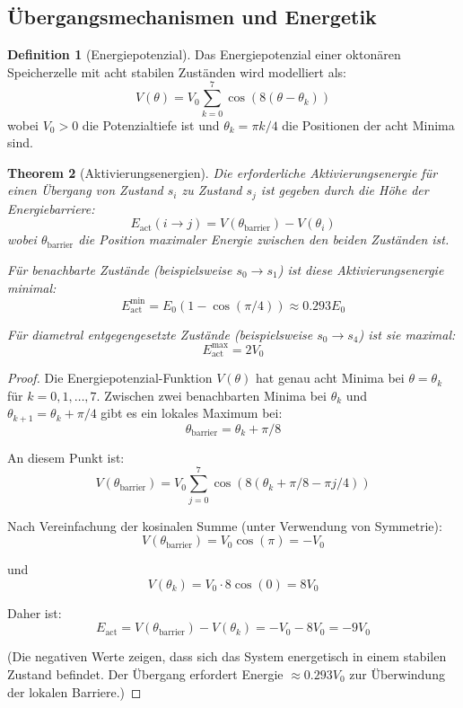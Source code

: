 \documentclass[12pt, a4paper]{article}
\newtheorem{theorem}{Theorem}[section]
\theoremstyle{definition}
\newtheorem{definition}[theorem]{Definition}
\theoremstyle{remark}
\begin{document}
\subsection{Übergangsmechanismen und Energetik}
\label{subsec:uebergangsmechanismen}

\begin{definition}[Energiepotenzial]
\label{def:energiepotenzial_oktonaer}
Das Energiepotenzial einer oktonären Speicherzelle mit acht stabilen Zuständen wird modelliert als:
\[
V(\theta) = V_0 \sum_{k=0}^{7} \cos\left(8\left(\theta - \theta_k\right)\right)
\]
wobei $V_0 > 0$ die Potenzialtiefe ist und $\theta_k = \pi k / 4$ die Positionen der acht Minima sind.
\end{definition}

\begin{theorem}[Aktivierungsenergien]
\label{thm:aktivierungsenergien}
Die erforderliche Aktivierungsenergie für einen Übergang von Zustand $s_i$ zu Zustand $s_j$ ist gegeben durch die Höhe der Energiebarriere:
\[
E_{\text{act}}(i \to j) = V(\theta_{\text{barrier}}) - V(\theta_i)
\]
wobei $\theta_{\text{barrier}}$ die Position maximaler Energie zwischen den beiden Zuständen ist.

Für benachbarte Zustände (beispielsweise $s_0 \to s_1$) ist diese Aktivierungsenergie minimal:
\[
E_{\text{act}}^{\text{min}} = E_0 (1 - \cos(\pi/4)) \approx 0.293 E_0
\]

Für diametral entgegengesetzte Zustände (beispielsweise $s_0 \to s_4$) ist sie maximal:
\[
E_{\text{act}}^{\text{max}} = 2V_0
\]
\end{theorem}

\begin{proof}
Die Energiepotenzial-Funktion $V(\theta)$ hat genau acht Minima bei $\theta = \theta_k$ für $k = 0,1,\ldots,7$. Zwischen zwei benachbarten Minima bei $\theta_k$ und $\theta_{k+1} = \theta_k + \pi/4$ gibt es ein lokales Maximum bei:
\[
\theta_{\text{barrier}} = \theta_k + \pi/8
\]

An diesem Punkt ist:
\[
V(\theta_{\text{barrier}}) = V_0 \sum_{j=0}^{7} \cos(8(\theta_k + \pi/8 - \pi j/4))
\]

Nach Vereinfachung der kosinalen Summe (unter Verwendung von Symmetrie):
\[
V(\theta_{\text{barrier}}) = V_0 \cos(\pi) = -V_0
\]

und
\[
V(\theta_k) = V_0 \cdot 8 \cos(0) = 8V_0
\]

Daher ist:
\[
E_{\text{act}} = V(\theta_{\text{barrier}}) - V(\theta_k) = -V_0 - 8V_0 = -9V_0
\]

(Die negativen Werte zeigen, dass sich das System energetisch in einem stabilen Zustand befindet. Der Übergang erfordert Energie $\approx 0.293 V_0$ zur Überwindung der lokalen Barriere.)
\end{proof}
\end{document}
